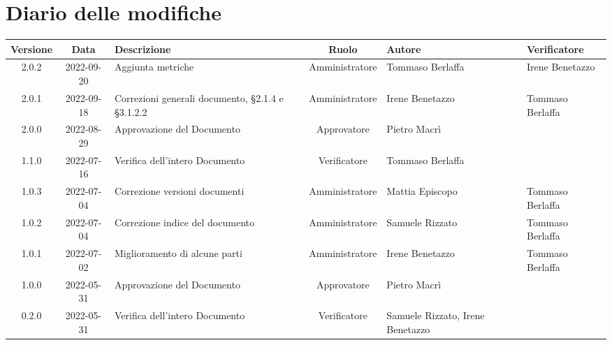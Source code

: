 \section*{Diario delle modifiche}
	\begin{center}
	\renewcommand{\arraystretch}{1.8} %
	\begin{longtable}{ |c|c|p{8em}|c|m{5em}|m{6em}| }
	\hline
	\textbf{Versione} & \textbf{Data} & \textbf{Descrizione} &  \textbf{Ruolo} &  \textbf{Autore} & \textbf{Verificatore}\\ %
	\hline %
  	2.0.2 & 2022-09-20 & Aggiunta \newline metriche & Amministratore & Tommaso \newline Berlaffa & Irene \newline Benetazzo\\
	\hline
	2.0.1 & 2022-09-18 & Correzioni generali documento, §2.1.4 e §3.1.2.2 & Amministratore & Irene \newline Benetazzo & Tommaso \newline Berlaffa\\
	\hline
	2.0.0 & 2022-08-29 & Approvazione del Documento & Approvatore & Pietro \newline Macrì & \\
	\hline
  	1.1.0 & 2022-07-16 & Verifica dell'intero Documento & Verificatore & Tommaso Berlaffa &  \\
	\hline
	1.0.3 & 2022-07-04 & Correzione versioni documenti & Amministratore & Mattia \newline Episcopo & Tommaso Berlaffa \\
	\hline
	1.0.2 & 2022-07-04 & Correzione indice del documento & Amministratore & Samuele \newline Rizzato & Tommaso Berlaffa \\
	\hline
	1.0.1 & 2022-07-02 & Miglioramento di alcune parti & Amministratore & Irene \newline Benetazzo & Tommaso Berlaffa \\
    \hline
	1.0.0 & 2022-05-31 & Approvazione del Documento & Approvatore & Pietro \newline Macrì & \\
	\hline
	0.2.0 & 2022-05-31 & Verifica dell'intero Documento & Verificatore & Samuele \newline Rizzato, Irene \newline Benetazzo & \\

\end{longtable}
\end{center}
